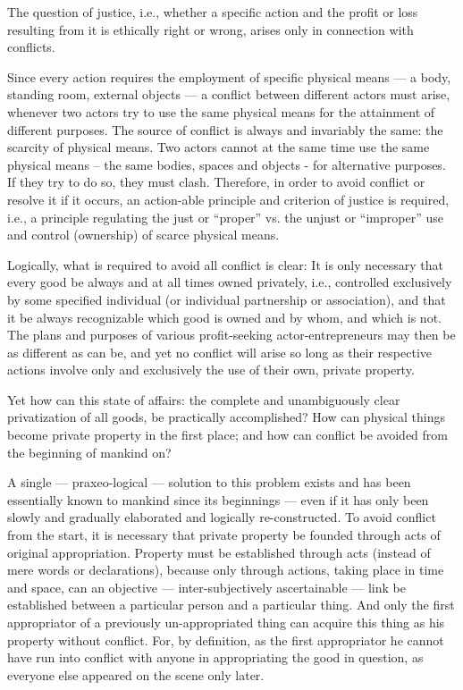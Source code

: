 The question of justice, i.e., whether a specific action and the profit or loss resulting from it is ethically right or wrong, arises only in connection with conflicts.

Since every action requires the employment of specific physical means — a body, standing room, external objects — a conflict between different actors must arise, whenever two actors try to use the same physical means for the attainment of different purposes. The source of conflict is always and invariably the same: the scarcity of physical means. Two actors cannot at the same time use the same physical means – the same bodies, spaces and objects - for alternative purposes. If they try to do so, they must clash. Therefore, in order to avoid conflict or resolve it if it occurs, an action-able principle and criterion of justice is required, i.e., a principle regulating the just or ``proper'' vs. the unjust or ``improper'' use and control (ownership) of scarce physical means.

Logically, what is required to avoid all conflict is clear: It is only necessary that every good be always and at all times owned privately, i.e., controlled exclusively by some specified individual (or individual partnership or association), and that it be always recognizable which good is owned and by whom, and which is not. The plans and purposes of various profit-seeking actor-entrepreneurs may then be as different as can be, and yet no conflict will arise so long as their respective actions involve only and exclusively the use of their own, private property.

Yet how can this state of affairs: the complete and unambiguously clear privatization of all goods, be practically accomplished? How can physical things become private property in the first place; and how can conflict be avoided from the beginning of mankind on?

A single — praxeo-logical — solution to this problem exists and has been essentially known to mankind since its beginnings — even if it has only been slowly and gradually elaborated and logically re-constructed. To avoid conflict from the start, it is necessary that private property be founded through acts of original appropriation. Property must be established through acts (instead of mere words or declarations), because only through actions, taking place in time and space, can an objective — inter-subjectively ascertainable — link be established between a particular person and a particular thing. And only the first appropriator of a previously un-appropriated thing can acquire this thing as his property without conflict. For, by definition, as the first appropriator he cannot have run into conflict with anyone in appropriating the good in question, as everyone else appeared on the scene only later.

